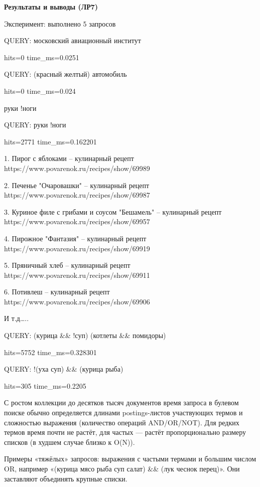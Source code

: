 \documentclass[12pt,a4paper]{article}
\begin{document}
\textbf{Результаты и выводы (ЛР7)}

Эксперимент: выполнено 5 запросов

QUERY: московский авиационный институт

hits=0 time\_ms=0.0251

QUERY: (красный \textbar\textbar{} желтый) автомобиль

hits=0 time\_ms=0.024

руки !ноги

QUERY: руки !ноги

hits=2771 time\_ms=0.162201

1. Пирог с яблоками -- кулинарный рецепт \textbar{}
https://www.povarenok.ru/recipes/show/69989

2. Печенье "Очаровашки" -- кулинарный рецепт \textbar{}
https://www.povarenok.ru/recipes/show/69987

3. Куриное филе с грибами и соусом "Бешамель" -- кулинарный рецепт
\textbar{} https://www.povarenok.ru/recipes/show/69957

4. Пирожное "Фантазия" -- кулинарный рецепт \textbar{}
https://www.povarenok.ru/recipes/show/69919

5. Пряничный хлеб -- кулинарный рецепт \textbar{}
https://www.povarenok.ru/recipes/show/69911

6. Потивлеш -- кулинарный рецепт \textbar{}
https://www.povarenok.ru/recipes/show/69906

И т.д\ldots..

QUERY: (курица \&\& !суп) \textbar\textbar{} (котлеты \&\& помидоры)

hits=5752 time\_ms=0.328301

QUERY: !(уха \textbar\textbar{} суп) \&\& (курица \textbar\textbar{}
рыба)

hits=305 time\_ms=0.2205

С ростом коллекции до десятков тысяч документов время запроса в булевом
поиске обычно определяется длинами postings-листов участвующих термов и
сложностью выражения (количество операций AND/OR/NOT). Для редких термов
время почти не растёт, для частых --- растёт пропорционально размеру
списков (в худшем случае близко к O(N)).

Примеры «тяжёлых» запросов: выражения с частыми термами и большим числом
OR, например «(курица \textbar\textbar{} мясо \textbar\textbar{} рыба
\textbar\textbar{} суп \textbar\textbar{} салат) \&\& (лук
\textbar\textbar{} чеснок \textbar\textbar{} перец)». Они заставляют
объединять крупные списки.
\end{document}
